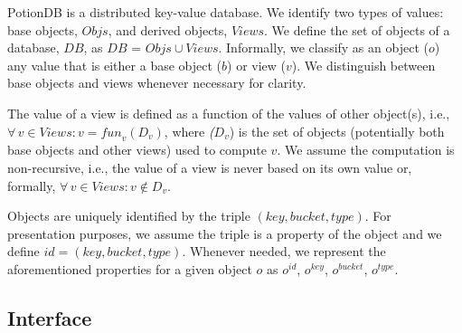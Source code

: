 \documentclass{vldb}
\begin{document}
PotionDB is a distributed key-value database.
We identify two types of values: base objects, $\mathit{Objs}$, and derived objects, $\mathit{Views}$.
We define the set of objects of a database, $\mathit{DB}$, as $\mathit{DB}$ = $\mathit{Objs} \cup \mathit{Views}$.
Informally, we classify as an object ($o$) any value that is either a base object ($b$) or view ($v$).
We distinguish between base objects and views whenever necessary for clarity.

The value of a view is defined as a function of the values of other object(s), i.e., 
$\forall\, v \in \mathit{Views} : v = \mathit{fun}_v(D_v)$, 
where \emph($D_v$) is the set of objects (potentially both base objects and other views) used to compute $v$.
We assume the computation is non-recursive, i.e., the value of a view is never based on its own value or, formally, 
$\forall\, v \in \mathit{Views} : v \notin D_v$.

Objects are uniquely identified by the triple $\mathit{(key, bucket, type)}$.
For presentation purposes, we assume the triple is a property of the object and we define $\mathit{id} = \mathit{(key, bucket, type)}$.
Whenever needed, we represent the aforementioned properties for a given object $o$ as
$o^{\mathit{id}}$, $o^{\mathit{key}}$, $o^{\mathit{bucket}}$, $o^{\mathit{type}}$.

\subsection{Interface}
\label{subsec:interface}
\end{document}

